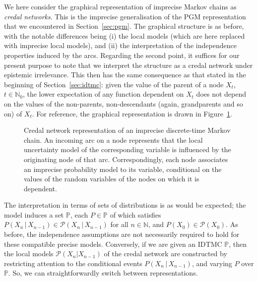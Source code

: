 \documentclass[graybox]{svmult}
\newcommand{\nats}{\mathbb{N}}
\newcommand{\natswith}{\nats_{0}}
\begin{document}
We here consider the graphical representation of imprecise Markov chains as \emph{credal networks}. This is the imprecise generalisation of the PGM representation that we encountered in Section~\ref{sec:pgm}. The graphical structure is as before, with the notable differences being (i) the local models (which are here replaced with imprecise local models), and (ii) the interpretation of the independence properties induced by the arcs. Regarding the second point, it suffices for our present purpose to note that we interpret the structure as a credal network under epistemic irrelevance. This then has the same consequence as that stated in the beginning of Section~\ref{sec:idtmc}: given the value of the parent of a node $X_t$, $t\in\natswith$, the lower expectation of any function dependent on $X_t$ does not depend on the values of the non-parents, non-descendants (again, grandparents and so on) of $X_t$. For reference, the graphical representation is drawn in Figure~\ref{fig:example_markov_credal}.

\begin{figure}
\centering
{}
\caption{Credal network representation of an imprecise discrete-time Markov chain. An incoming arc on a node represents that the local uncertainty model of the corresponding variable is influenced by the originating node of that arc. Correspondingly, each node associates an imprecise probability model to its variable, conditional on the values of the random variables of the nodes on which it is dependent.}
\label{fig:example_markov_credal}
\end{figure}
The interpretation in terms of sets of distributions is as would be expected; the model induces a set $\mathbb{P}$, each $P\in\mathbb{P}$ of which satisfies $P(X_n\,\vert\,X_{n-1})\in\mathcal{P}(X_n\,\vert\,X_{n-1})$ for all $n\in\nats$, and $P(X_0)\in\mathcal{P}(X_0)$. As before, the independence assumptions are not necessarily required to hold for these compatible precise models. Conversely, if we are given an IDTMC $\mathbb{P}$, then the local models $\mathcal{P}(X_n\vert X_{n-1})$ of the credal network are constructed by restricting attention to the conditional events $P(X_{n}\,\vert\,X_{n-1})$, and varying $P$ over $\mathbb{P}$. So, we can straightforwardly switch between representations.
\end{document}
